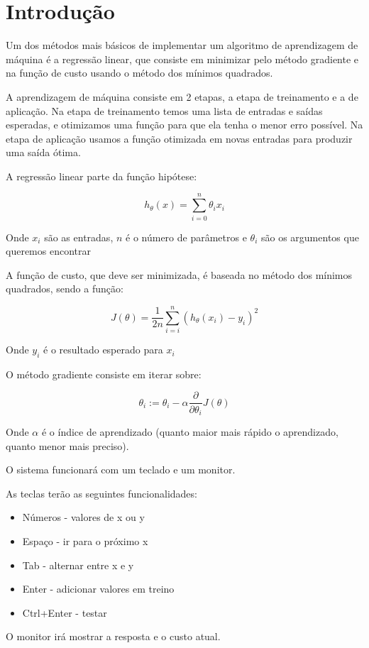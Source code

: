 \section{Introdução}

Um dos métodos mais básicos de implementar um algoritmo de 
aprendizagem de máquina é a regressão linear, que consiste em minimizar
pelo método gradiente e na função de custo usando o método dos 
mínimos quadrados.

A aprendizagem de máquina consiste em 2 etapas, a etapa de treinamento
e a de aplicação. Na etapa de treinamento temos uma lista de entradas e
saídas esperadas, e otimizamos uma função para que ela tenha o menor
erro possível. Na etapa de aplicação usamos a função otimizada em 
novas entradas para produzir uma saída ótima.

A regressão linear parte da função hipótese:

$$h_\theta (x) = \sum_{i=0}^{n} \theta_i x_i$$

Onde $x_i$ são as entradas, $n$ é o número de parâmetros e 
$\theta_i$ são os argumentos que queremos encontrar

A função de custo, que deve ser minimizada, é baseada no método
dos mínimos quadrados, sendo a função:

$$ J(\theta) = \frac{1}{2n}\sum_{i=i}^{n}(h_\theta (x_i) - y_i)^2$$

Onde $y_i$ é o resultado esperado para $x_i$

O método gradiente consiste em iterar sobre:

$$ \theta_i := \theta_i - 
    \alpha \frac{\partial}{\partial \theta_i} J(\theta)$$

Onde $\alpha$ é o índice de aprendizado (quanto maior mais 
rápido o aprendizado, quanto menor mais preciso).

O sistema funcionará com um teclado e um monitor.

As teclas terão as seguintes funcionalidades:

\begin{itemize}
    \item Números - valores de x ou y
    \item Espaço - ir para o próximo x
    \item Tab - alternar entre x e y
    \item Enter - adicionar valores em treino
    \item Ctrl+Enter - testar
\end{itemize}

O monitor irá mostrar a resposta e o custo atual.